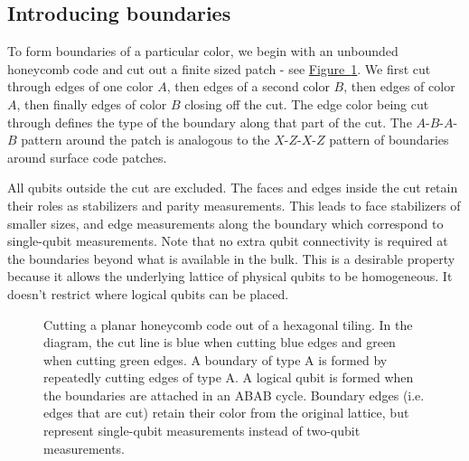 \documentclass[onecolumn,unpublished,a4paper]{quantumarticle}
\theoremstyle{definition}
\theoremstyle{definition}
\theoremstyle{definition}
\newcommand{\fig}[1]{\hyperref[fig:#1]{Figure~\ref*{fig:#1}}}
\begin{document}
\subsection{Introducing boundaries}

To form boundaries of a particular color, we begin with an unbounded honeycomb code and cut out a finite sized patch - see \fig{cut_out_patch}.
We first cut through edges of one color $A$, then edges of a second color $B$, then edges of color $A$, then finally edges of color $B$ closing off the cut.
The edge color being cut through defines the type of the boundary along that part of the cut.
The $A$-$B$-$A$-$B$ pattern around the patch is analogous to the $X$-$Z$-$X$-$Z$ pattern of boundaries around surface code patches.

All qubits outside the cut are excluded.
The faces and edges inside the cut retain their roles as stabilizers and parity measurements.
This leads to face stabilizers of smaller sizes, and edge measurements along the boundary which correspond to single-qubit measurements.
Note that no extra qubit connectivity is required at the boundaries beyond what is available in the bulk.
This is a desirable property because it allows the underlying lattice of physical qubits to be homogeneous.
It doesn't restrict where logical qubits can be placed.

\begin{figure}[ht!]
    \centering
    \caption{
    Cutting a planar honeycomb code out of a hexagonal tiling.
    In the diagram, the cut line is blue when cutting blue edges and green when cutting green edges.
    A boundary of type A is formed by repeatedly cutting edges of type A.
    A logical qubit is formed when the boundaries are attached in an ABAB cycle.
    Boundary edges (i.e. edges that are cut) retain their color from the original lattice, but represent single-qubit measurements instead of two-qubit measurements.
    }
    \label{fig:cut_out_patch}
\end{figure}
\end{document}
